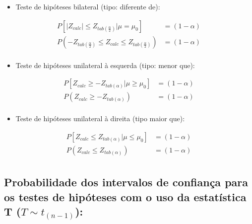 \documentclass[
]{book}
\providecommand{\tightlist}{%
  \setlength{\itemsep}{0pt}\setlength{\parskip}{0pt}}
\begin{document}
\hfill\break

\begin{itemize}
\tightlist
\item
  Teste de hipóteses bilateral (tipo: diferente de):
\end{itemize}

\hfill\break

\begin{align*}
P[\left|Z_{calc}\right| \le {Z}_{tab\left(\frac{\alpha }{2}\right)}|\mu=\mu_{0}] & =(1-\alpha)\\
P(-{Z}_{tab\left(\frac{\alpha }{2}\right)} \le  Z_{calc} \le {Z}_{tab\left(\frac{\alpha }{2}\right)}) & = (1-\alpha)\\
\end{align*}

\hfill\break

\begin{itemize}
\tightlist
\item
  Teste de hipóteses unilateral à esquerda (tipo: menor que):
\end{itemize}

\hfill\break

\begin{align*}
P[Z_{calc} \ge -{Z}_{tab\left(\alpha \right)}|\mu \ge \mu_{0}] & =(1-\alpha) \\
P(Z_{calc} \ge -{Z}_{tab\left(\alpha \right)}) & =(1-\alpha)\\
\end{align*}

\hfill\break

\begin{itemize}
\tightlist
\item
  Teste de hipóteses unilateral à direita (tipo maior que):
\end{itemize}

\hfill\break

\begin{align*}
P[Z_{calc} \le {Z}_{tab\left(\alpha \right)}|\mu \le \mu_{0}] & =(1-\alpha)\\
P(Z_{calc} \le {Z}_{tab\left(\alpha \right)}) & =(1-\alpha)\\
\end{align*}

\hfill\break

\hypertarget{probabilidade-dos-intervalos-de-confianuxe7a-para-os-testes-de-hipuxf3teses-com-o-uso-da-estatuxedstica-t-tsim-t_n-1}{%
\subsection{\texorpdfstring{Probabilidade dos intervalos de confiança para os testes de hipóteses com o uso da estatística T (\(T\sim t_{(n-1)}\)):}{Probabilidade dos intervalos de confiança para os testes de hipóteses com o uso da estatística T (T\textbackslash sim t\_\{(n-1)\}):}}\label{probabilidade-dos-intervalos-de-confianuxe7a-para-os-testes-de-hipuxf3teses-com-o-uso-da-estatuxedstica-t-tsim-t_n-1}}
\end{document}
